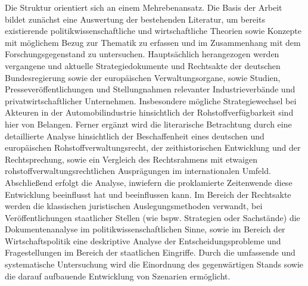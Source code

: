 \documentclass[12pt,a4paper,oneside]{book} %
\begin{document}
Die Struktur orientiert sich an einem Mehrebenansatz. Die Basis der Arbeit bildet zunächst eine Auswertung der bestehenden Literatur, um bereits existierende politikwissenschaftliche und wirtschaftliche Theorien sowie Konzepte mit möglichem Bezug zur Thematik zu erfassen und im Zusammenhang mit dem Forschungsgegenstand zu untersuchen. Hauptsächlich herangezogen werden vergangene und aktuelle Strategiedokumente und Rechtsakte der deutschen Bundesregierung sowie der europäischen Verwaltungsorgane, sowie Studien, Presseveröffentlichungen und Stellungnahmen relevanter Industrieverbände und privatwirtschaftlicher Unternehmen. Insbesondere mögliche Strategiewechsel bei Akteuren in der Automobilindustrie hinsichtlich der Rohstoffverfügbarkeit sind hier von Belangen. Ferner ergänzt wird die literarische Betrachtung durch eine detaillierte Analyse hinsichtlich der Beschaffenheit eines deutschen und europäischen Rohstoffverwaltungsrecht, der zeithistorischen Entwicklung und der Rechtsprechung, sowie ein Vergleich des Rechtsrahmens mit etwaigen rohstoffverwaltungsrechtlichen Ausprägungen im internationalen Umfeld. Abschließend erfolgt die Analyse, inwiefern die proklamierte Zeitenwende diese Entwicklung beeinflusst hat und beeinflussen kann. Im Bereich der Rechtsakte werden die klassischen juristischen Auslegungsmethoden verwandt, bei Veröffentlichungen staatlicher Stellen (wie bspw. Strategien oder Sachstände) die Dokumentenanalyse im politikwissenschaftlichen Sinne,\autocite[203]{reh_quellen-_1995} sowie im Bereich der Wirtschaftspolitik eine deskriptive Analyse der Entscheidungsprobleme und Fragestellungen im Bereich der staatlichen Eingriffe.\autocite[6f.]{schmidt_theorie_2019} Durch die umfassende und systematische Untersuchung wird die Einordnung des gegenwärtigen Stands sowie die darauf aufbauende Entwicklung von Szenarien ermöglicht.
\end{document}
